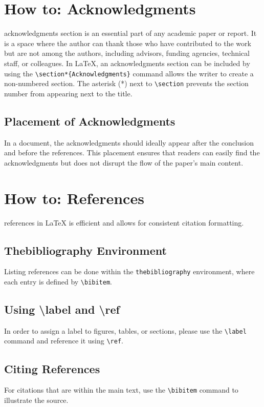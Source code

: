 \documentclass[12pt,journal,compsoc]{IEEEtran}
\begin{document}
\section{How to: Acknowledgments}
 acknowledgments section is an essential part of any academic paper or report. It is a space where the author can thank those who have contributed to the work but are not among the authors, including advisors, funding agencies, technical staff, or colleagues. In \LaTeX, an acknowledgments section can be included by using the \texttt{\textbackslash section*\{Acknowledgments\}} command allows the writer to create a non-numbered section. The asterisk (*) next to \texttt{\textbackslash section} prevents the section number from appearing next to the title.

\subsection*{Placement of Acknowledgments}
In a document, the acknowledgments should ideally appear after the conclusion and before the references. This placement ensures that readers can easily find the acknowledgments but does not disrupt the flow of the paper's main content.

\section{How to: References}
 references in \LaTeX{} is efficient and allows for consistent citation formatting.  

\subsection{Thebibliography Environment}
Listing references can be done within the \texttt{thebibliography} environment, where each entry is defined by \texttt{\textbackslash bibitem}. 

\subsection{Using \textbackslash label and \textbackslash ref}
In order to assign a label to figures, tables, or sections, please use the \texttt{\textbackslash label} command and reference it using \texttt{\textbackslash ref}.

\subsection{Citing References}
For citations that are within the main text, use the \texttt{\textbackslash bibitem} command to illustrate the source. 
\end{document}
